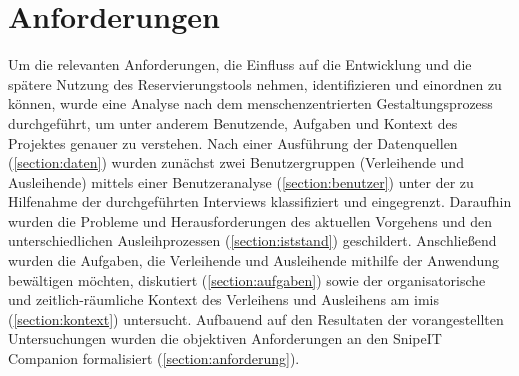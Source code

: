 
\chapter{Anforderungen}
\label{chapter-analyse}

Um die relevanten Anforderungen, die Einfluss auf die Entwicklung und die spätere Nutzung des
Reservierungstools nehmen, identifizieren und einordnen zu können, wurde eine Analyse nach dem
menschenzentrierten Gestaltungsprozess durchgeführt, um unter anderem Benutzende, Aufgaben und
Kontext des Projektes genauer zu verstehen. Nach einer Ausführung der Datenquellen
(\ref{section:daten}) wurden zunächst zwei Benutzergruppen (Verleihende und Ausleihende) mittels
einer Benutzeranalyse (\ref{section:benutzer}) unter der zu Hilfenahme der durchgeführten Interviews
klassifiziert und eingegrenzt. Daraufhin wurden die Probleme und Herausforderungen des aktuellen
Vorgehens und den unterschiedlichen Ausleihprozessen (\ref{section:iststand}) geschildert.
Anschließend wurden die Aufgaben, die Verleihende und Ausleihende mithilfe der Anwendung bewältigen
möchten, diskutiert (\ref{section:aufgaben}) sowie der organisatorische und zeitlich-räumliche
Kontext des Verleihens und Ausleihens am \ac{imis} (\ref{section:kontext}) untersucht. Aufbauend auf
den Resultaten der vorangestellten Untersuchungen wurden die objektiven Anforderungen an den SnipeIT
Companion formalisiert (\ref{section:anforderung}).

